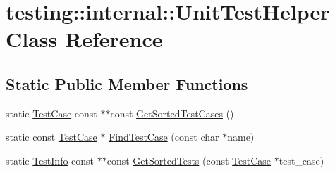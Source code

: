 \hypertarget{classtesting_1_1internal_1_1_unit_test_helper}{\section{testing\-:\-:internal\-:\-:Unit\-Test\-Helper Class Reference}
\label{classtesting_1_1internal_1_1_unit_test_helper}
}
\subsection*{Static Public Member Functions}
\begin{DoxyCompactItemize}
\item 
static \hyperlink{classtesting_1_1_test_case}{Test\-Case} const $\ast$$\ast$const \hyperlink{classtesting_1_1internal_1_1_unit_test_helper_a71f74b681487d05b2f85d4fd86ece122}{Get\-Sorted\-Test\-Cases} ()
\item 
static const \hyperlink{classtesting_1_1_test_case}{Test\-Case} $\ast$ \hyperlink{classtesting_1_1internal_1_1_unit_test_helper_a46303cbb7a6abb456f7b1350542113ac}{Find\-Test\-Case} (const char $\ast$name)
\item 
static \hyperlink{classtesting_1_1_test_info}{Test\-Info} const $\ast$$\ast$const \hyperlink{classtesting_1_1internal_1_1_unit_test_helper_ad1c45e34dc56b41b6fd6d0452cd5278b}{Get\-Sorted\-Tests} (const \hyperlink{classtesting_1_1_test_case}{Test\-Case} $\ast$test\-\_\-case)
\end{DoxyCompactItemize}


